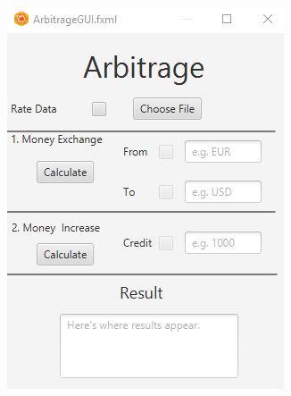 \documentclass[a4paper,11pt]{article}
\begin{document}
\begin{center}
\includegraphics[scale=1]{ArbitrageGUI}
\end{center}
\end{document}
